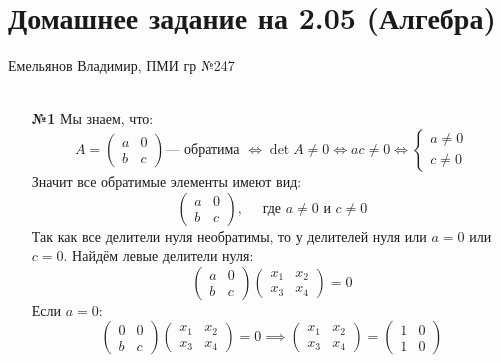 \documentclass[a4paper]{article}
\newcommand{\mat}[1]{\begin{pmatrix} #1 \end{pmatrix}}
\newcommand{\case}[1]{\begin{cases} #1 \end{cases}}
\newcommand{\lr}{\Leftrightarrow}
\begin{document}
\section*{Домашнее задание на 2.05 (Алгебра)}
 {\large Емельянов Владимир, ПМИ гр №247}\\\\
\begin{enumerate}
    \item[\textbf{№1}]Мы знаем, что:
    $$A=\begin{pmatrix}a&0\\ b&c\end{pmatrix} \text{--- обратима }\lr \det A \neq 0 \lr ac \neq 0 \lr \case{a \neq 0\\c \neq 0} $$
    Значит все обратимые элементы имеют вид:
    $$\begin{pmatrix}a&0\\ b&c\end{pmatrix}, \quad \text{ где } a\neq 0 \text{ и } c \neq 0$$
    Так как все делители нуля необратимы, то у делителей нуля или $a=0$ или $c = 0$. Найдём левые делители нуля:
    $$\mat{a & 0 \\ b & c}\mat{x_1 & x_2 \\ x_3 & x_4} = 0$$
    Если $a = 0$:
    $$\mat{0 & 0 \\ b & c}\mat{x_1 & x_2 \\ x_3 & x_4} = 0 \implies \mat{x_1 & x_2 \\ x_3 & x_4} = \mat{1 & 0 \\ 1 & 0}$$
    
\end{enumerate}
\end{document}
